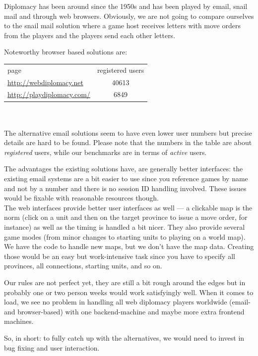 \documentclass[11pt,a4paper]{report}
\begin{document}
Diplomacy has been around since the 1950s and has been played by email, snail
mail and through web browsers. Obviously, we are not going to compare ourselves
to the snail mail solution where a game host receives letters with move orders
from the players and the players send each other letters.

Noteworthy browser based solutions are:\\

\begin{tabular}{lc}
  page                            & registered users \\
  \url{http://webdiplomacy.net}   & 40613 \\
  \url{http://playdiplomacy.com/} & 6849
\end{tabular}
\\
\\The alternative email solutions seem to have even lower user numbers but precise
details are hard to be found. Please note that the numbers in
the table are about {\em registered\/} users, while our benchmarks are in terms
of {\em active\/} users.

The advantages the existing solutions have, are generally better interfaces:
the existing email systems are a bit easier to use since you reference games by
name and not by a number and there is no session ID handling involved.
These issues would be fixable with reasonable resources though. \\
The web interfaces provide better user interfaces as well --- a clickable map
is the norm (click on a unit and then on the target province to issue a move
order, for instance) as well as the timing is handled a bit nicer. They also
provide several game modes (from minor changes to starting units to playing on
a world map). We have the code to handle new maps, but we don't have the map
data. Creating those would be an easy but work-intensive task since you have
to specify all provinces, all connections, starting units, and so on.

Our rules are not perfect yet, they are still a bit rough around the edges but
in probably one or two person weeks would work satisfyingly well.
When it comes to load, we see no problem in handling all web diplomacy
players worldwide (email- and browser-based) with one backend-machine and maybe
more extra frontend machines.

So, in short: to fully catch up with the alternatives, we would need to invest
in bug fixing and user interaction.
\end{document}
